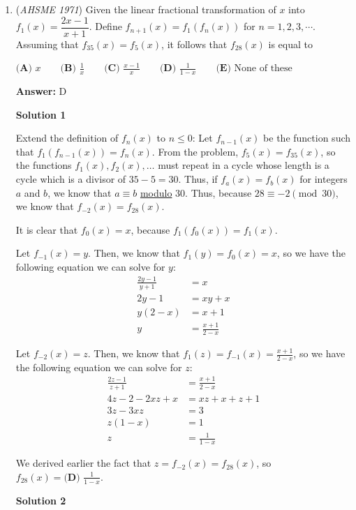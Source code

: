 \begin{enumerate}
	\item (\textit{AHSME 1971}) Given the linear fractional transformation of $x$ into $f_1(x)=\dfrac{2x-1}{x+1}$. Define $f_{n+1}(x)=f_1(f_n(x))$ for $n=1,2,3,\cdots$. 
Assuming that $f_{35}(x)=f_5(x)$, it follows that $f_{28}(x)$ is equal to


 $\textbf{(A) }x\qquad \textbf{(B) }\frac{1}{x}\qquad \textbf{(C) }\frac{x-1}{x}\qquad \textbf{(D) }\frac{1}{1-x}\qquad  \textbf{(E) }\text{None of these}$

 \textbf{Answer: }D



\textbf{Solution 1}

Extend the definition of $f_n(x)$ to $n\leq0$: Let $f_{n-1}(x)$ be the function such that $f_1(f_{n-1}(x))=f_n(x)$. From the problem, $f_5(x)=f_{35}(x)$, so the functions $f_1(x),f_2(x),\ldots$ must repeat in a cycle whose length is a cycle which is a divisor of $35-5=30$. Thus, if $f_a(x)=f_b(x)$ for integers $a$ and $b$, we know that $a\equiv b$ \href{https://artofproblemsolving.com/wiki/index.php?title=Modulo}{modulo} $30$. Thus, because $28\equiv-2\pmod{30}$, we know that $f_{-2}(x)=f_{28}(x)$.

 It is clear that $f_0(x)=x$, because $f_1(f_0(x))=f_1(x)$.

 Let $f_{-1}(x)=y$. Then, we know that $f_1(y)=f_0(x)=x$, so we have the following equation we can solve for $y$:\begin{align*}\frac{2y-1}{y+1} &= x \\2y-1 &= xy+x \\y(2-x) &= x+1 \\y &= \frac{x+1}{2-x}\end{align*}


 Let $f_{-2}(x)=z$. Then, we know that $f_1(z)=f_{-1}(x)=\frac{x+1}{2-x}$, so we have the following equation we can solve for $z$:\begin{align*}\frac{2z-1}{z+1} &= \frac{x+1}{2-x} \\4z-2-2xz+x &= xz+x+z+1 \\3z-3xz &= 3 \\z(1-x) &= 1 \\z &= \frac1{1-x}\end{align*}


 We derived earlier the fact that $z=f_{-2}(x)=f_{28}(x)$, so $f_{28}(x)=\boxed{\textbf{(D) }\frac{1}{1-x}}$.

 



\textbf{Solution 2}


\end{enumerate}
